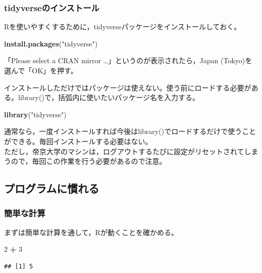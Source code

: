 \documentclass[]{article}
\newenvironment{Shaded}{\begin{snugshade}}{\end{snugshade}}
\newcommand{\KeywordTok}[1]{\textcolor[rgb]{0.13,0.29,0.53}{\textbf{#1}}}
\newcommand{\DecValTok}[1]{\textcolor[rgb]{0.00,0.00,0.81}{#1}}
\newcommand{\StringTok}[1]{\textcolor[rgb]{0.31,0.60,0.02}{#1}}
\newcommand{\OperatorTok}[1]{\textcolor[rgb]{0.81,0.36,0.00}{\textbf{#1}}}
\newcommand{\NormalTok}[1]{#1}
\begin{document}
\subsubsection{tidyverseのインストール}\label{tidyverse}

Rを使いやすくするために，tidyverseパッケージをインストールしておく。

\begin{Shaded}
\begin{Highlighting}[]
\KeywordTok{install.packages}\NormalTok{(}\StringTok{"tidyverse"}\NormalTok{)}
\end{Highlighting}
\end{Shaded}

「Please select a CRAN mirror \ldots{}」というのが表示されたら，Japan
(Tokyo)を選んで「OK」を押す。

インストールしただけではパッケージは使えない。使う前にロードする必要がある。library()で，括弧内に使いたいパッケージ名を入力する。

\begin{Shaded}
\begin{Highlighting}[]
\KeywordTok{library}\NormalTok{(}\StringTok{"tidyverse"}\NormalTok{)}
\end{Highlighting}
\end{Shaded}

通常なら，一度インストールすれば今後はlibrary()でロードするだけで使うことができる。毎回インストールする必要はない。\\
ただし，帝京大学のマシンは，ログアウトするたびに設定がリセットされてしまうので，毎回この作業を行う必要があるので注意。

\subsection{プログラムに慣れる}

\subsubsection{簡単な計算}

まずは簡単な計算を通して，Rが動くことを確かめる。

\begin{Shaded}
\begin{Highlighting}[]
\DecValTok{2} \OperatorTok{+}\StringTok{ }\DecValTok{3}
\end{Highlighting}
\end{Shaded}

\begin{verbatim}
## [1] 5
\end{verbatim}
\end{document}
